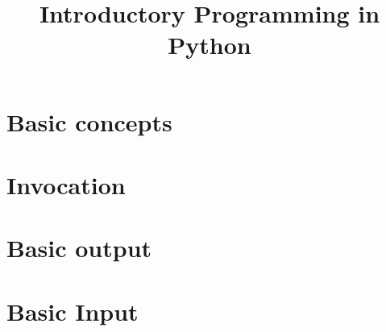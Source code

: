 \documentclass[a4paper,11pt]{report}
\title{Introductory Programming in Python}
\begin{document}
\maketitle
\chapter{Basic concepts}
    
\chapter{Invocation}
    
\chapter{Basic output}
    
\chapter{Basic Input}
    
\end{document}
